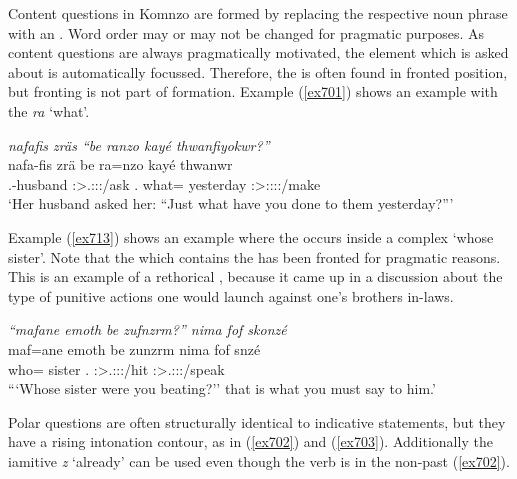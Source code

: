 Content questions in Komnzo are formed by replacing the respective noun phrase with an . Word order may or may not be changed for pragmatic purposes. As content questions are always pragmatically motivated, the element which is asked about is automatically focussed. Therefore, the  is often found in fronted position, but fronting is not part of  formation. Example (\ref{ex701}) shows an example with the  \emph{ra} `what'.

\begin{exe}
	\ex \emph{nafafis zräs ``be ranzo kayé thwanfiyokwr?''}\\
	\gll nafa-fis zrä be ra=nzo kayé thwanwr\\
	\Third.\Poss-husband \Stsg:\Sbj>\Tsg.\F:\Obj:\Irr:\Pfv/ask \Ssg.{\Erg} what={\Only} yesterday \Stsg:\Sbj>\Stpl:\Obj:\Rpst:\Ipfv:\Venit/make\\
	\trans `Her husband asked her: ``Just what have you done to them yesterday?'''\\
	\label{ex701}
\end{exe}

Example (\ref{ex713}) shows an example where the  occurs inside a complex  `whose sister'. Note that the  which contains the  has been fronted for pragmatic reasons. This is an example of a rethorical , because it came up in a discussion about the type of punitive actions one would launch against one's brothers in-laws.

\begin{exe}
	\ex \emph{``mafane emoth be zufnzrm?'' nima fof skonzé}\\
	\gll maf=ane emoth be zunzrm nima fof snzé\\
	who={\Poss} sister \Ssg.{\Erg} \Stsg:\Sbj>\Tsg.\F:\Obj:\Pst:\Dur/hit {\Quot} {\Emph} \Ssg:\Sbj>\Tsg.\Masc:\Obj:\Imp:\Ipfv/speak\\
	\trans ```Whose sister were you beating?'' that is what you must say to him.'\\
	\label{ex713}
\end{exe}

Polar questions are often structurally identical to indicative statements, but they have a rising intonation contour, as in (\ref{ex702}) and (\ref{ex703}).  Additionally the iamitive  \emph{z} `already' can be used even though the verb is in the non-past (\ref{ex702}).

